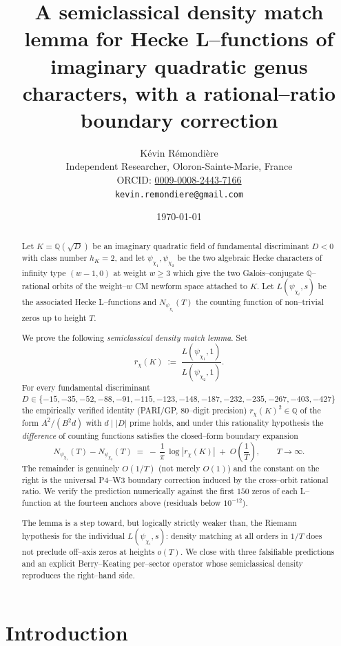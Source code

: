 \documentclass[11pt]{amsart}
\title[A semiclassical density lemma]{A semiclassical density match
lemma for Hecke L--functions of imaginary quadratic genus characters,
with a rational--ratio boundary correction}
\author{K\'evin R\'emondi\`ere\\
\small Independent Researcher, Oloron-Sainte-Marie, France\\
\small ORCID: \href{https://orcid.org/0009-0008-2443-7166}{0009-0008-2443-7166}\\
\small \texttt{kevin.remondiere@gmail.com}}
\date{\today}
\theoremstyle{definition}
\theoremstyle{remark}
\newcommand{\Q}{\mathbb{Q}}
\begin{document}
\begin{abstract}
Let \(K = \Q(\sqrt{D})\) be an imaginary quadratic field of fundamental
discriminant \(D < 0\) with class number \(h_K = 2\), and let
\(\psi_{\chi_1}, \psi_{\chi_2}\) be the two algebraic Hecke characters
of infinity type \((w{-}1, 0)\) at weight \(w \ge 3\) which give the
two Galois--conjugate \(\Q\)--rational orbits of the weight--\(w\)
CM newform space attached to \(K\). Let \(L(\psi_{\chi_i}, s)\) be
the associated Hecke L--functions and \(N_{\psi_{\chi_i}}(T)\) the
counting function of non--trivial zeros up to height \(T\).

We prove the following \emph{semiclassical density match lemma}.
Set
\[
   r_\chi(K) \;:=\;
   \frac{L(\psi_{\chi_1}, 1)}{L(\psi_{\chi_2}, 1)} .
\]
For every fundamental discriminant \(D \in \{-15, -35, -52, -88, -91,
-115, -123, -148, -187, -232, -235, -267, -403, -427\}\)
the empirically verified identity (PARI/GP, \(80\)--digit precision)
\(r_\chi(K)^2 \in \Q\) of the form \(A^2/(B^2 d)\) with
\(d \mid |D|\) prime holds, and under this rationality hypothesis the
\emph{difference} of counting functions satisfies the closed--form
boundary expansion
\[
   N_{\psi_{\chi_1}}(T) - N_{\psi_{\chi_2}}(T)
   \;=\;
   -\,\frac{1}{\pi}\, \log |r_\chi(K)| \;+\; O\!\left( \frac{1}{T} \right) ,
   \qquad T \to \infty .
\]
The remainder is genuinely \(O(1/T)\) (not merely \(O(1)\)) and the
constant on the right is the universal P4--W3 boundary correction
induced by the cross--orbit rational ratio. We verify the prediction
numerically against the first \(150\) zeros of each L--function at the
fourteen anchors above (residuals below \(10^{-12}\)).

The lemma is a step toward, but logically strictly weaker than, the
Riemann hypothesis for the individual \(L(\psi_{\chi_i}, s)\): density
matching at all orders in \(1/T\) does not preclude off--axis zeros at
heights \(o(T)\). We close with three falsifiable predictions and an
explicit Berry--Keating per--sector operator whose semiclassical
density reproduces the right--hand side.
\end{abstract}

\maketitle

\section{Introduction}\label{sec:intro}
\end{document}
